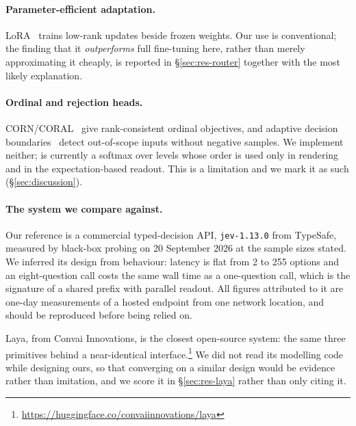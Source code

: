 \paragraph{Parameter-efficient adaptation.}
LoRA~\cite{lora} trains low-rank updates beside frozen weights. Our use is
conventional; the finding that it \emph{outperforms} full fine-tuning here,
rather than merely approximating it cheaply, is reported in
\S\ref{sec:res-router} together with the most likely explanation.

\paragraph{Ordinal and rejection heads.}
CORN/CORAL~\cite{corn} give rank-consistent ordinal objectives, and
adaptive decision boundaries~\cite{adb} detect out-of-scope inputs without
negative samples. We implement neither; \score{} is currently a softmax
over levels whose order is used only in rendering and in the
expectation-based readout. This is a limitation and we mark it as such
(\S\ref{sec:discussion}).

\paragraph{The system we compare against.}
Our reference is a commercial typed-decision API, \texttt{jev-1.13.0} from
TypeSafe, measured by black-box probing on 20 September 2026 at the sample
sizes stated. We inferred its design from behaviour: latency is flat from 2
to 255 options and an eight-question call costs the same wall time as a
one-question call, which is the signature of a shared prefix with parallel
readout. All figures attributed to it are one-day measurements of a hosted
endpoint from one network location, and should be reproduced before being
relied on.

Laya, from Convai Innovations, is the closest open-source system: the
same three primitives behind a near-identical
interface.\footnote{\url{https://huggingface.co/convaiinnovations/laya}}
We did not read its modelling code while designing ours, so that
converging on a similar design would be evidence rather than imitation,
and we score it in \S\ref{sec:res-laya} rather than only citing it.
